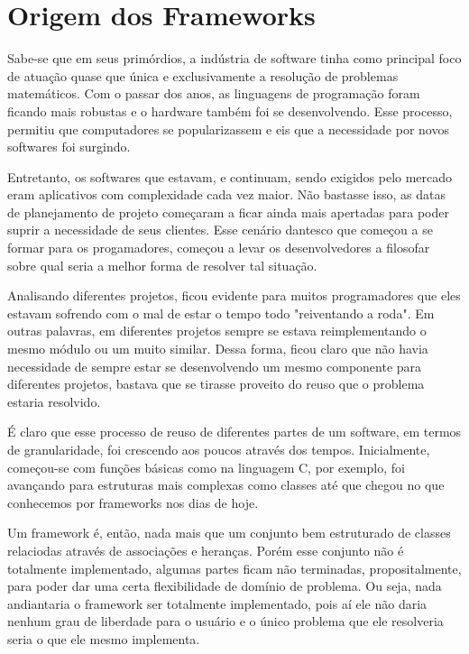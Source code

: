 \documentclass[
    12pt,       %
    openright,      %
    twoside,      %
    a4paper,      %
    english,      %
    french,       %
    spanish,      %
    brazil,       %
    ]{abntex2}
\begin{document}
      \section{Origem dos Frameworks}
          Sabe-se que em seus primórdios, a indústria de software tinha como principal
          foco de atuação quase que única e exclusivamente a resolução de problemas
          matemáticos. Com o passar dos anos, as linguagens de programação
          foram ficando mais robustas e o hardware também foi se desenvolvendo. Esse
          processo, permitiu que computadores se popularizassem e eis que a necessidade
          por novos softwares foi surgindo.

          Entretanto, os softwares que estavam, e continuam, sendo exigidos pelo
          mercado eram aplicativos com complexidade cada vez maior. Não bastasse isso,
          as datas de planejamento de projeto começaram a ficar ainda mais apertadas
          para poder suprir a necessidade de seus clientes. Esse cenário dantesco
          que começou a se formar para os progamadores, começou a levar os desenvolvedores
          a filosofar sobre qual seria a melhor forma de resolver tal situação.

          Analisando diferentes projetos, ficou evidente para muitos programadores
          que eles estavam sofrendo com o mal de estar o tempo todo "reiventando
          a roda". Em outras palavras, em diferentes projetos sempre se estava
          reimplementando o mesmo módulo ou um muito similar. Dessa forma, ficou
          claro que não havia necessidade de sempre estar se desenvolvendo um mesmo
          componente para diferentes projetos, bastava que se tirasse proveito do reuso
          que o problema estaria resolvido.

          É claro que esse processo de reuso de diferentes partes de um software,
          em termos de granularidade, foi crescendo aos poucos através dos tempos.
          Inicialmente, começou-se com funções básicas como na linguagem C, por exemplo,
          foi avançando para estruturas mais complexas como classes até que chegou
          no que conhecemos por frameworks nos dias de hoje.

          Um framework é, então, nada mais que um conjunto bem estruturado de classes
          relaciodas através de associações e heranças. Porém esse conjunto não
          é totalmente implementado, algumas partes ficam não terminadas, propositalmente,
          para poder dar uma certa flexibilidade de domínio de problema. Ou seja, nada
          andiantaria o framework ser totalmente implementado, pois
          aí ele não daria nenhum grau de liberdade para o usuário e o único problema
          que ele resolveria seria o que ele mesmo implementa.
\end{document}
